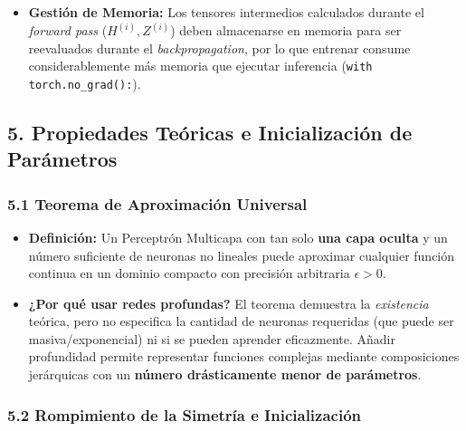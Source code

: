 \begin{itemize}
	\item \textbf{Gestión de Memoria:} Los tensores intermedios calculados durante el \emph{forward pass} ($H^{(i)}, Z^{(i)}$) deben almacenarse en memoria para ser reevaluados durante el \emph{backpropagation}, por lo que entrenar consume considerablemente más memoria que ejecutar inferencia (\texttt{with torch.no\_grad():}).
\end{itemize}

\subsection{5. Propiedades Teóricas e Inicialización de Parámetros}

\subsubsection{5.1 Teorema de Aproximación Universal}

\begin{itemize}
	\item \textbf{Definición:} Un Perceptrón Multicapa con tan solo \textbf{una capa oculta} y un número suficiente de neuronas no lineales puede aproximar cualquier función continua en un dominio compacto con precisión arbitraria $\epsilon > 0$.
	
	\item \textbf{¿Por qué usar redes profundas?} El teorema demuestra la \emph{existencia} teórica, pero no especifica la cantidad de neuronas requeridas (que puede ser masiva/exponencial) ni si se pueden aprender eficazmente. Añadir profundidad permite representar funciones complejas mediante composiciones jerárquicas con un \textbf{número drásticamente menor de parámetros}.
\end{itemize}

\subsubsection{5.2 Rompimiento de la Simetría e Inicialización}

